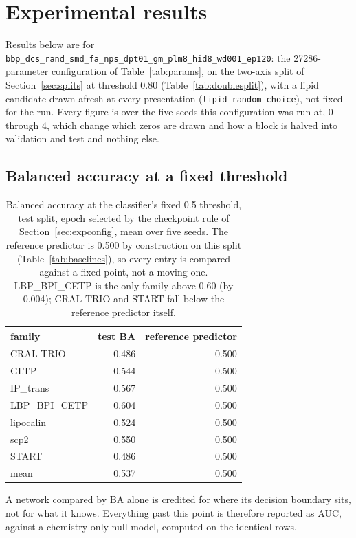 \section{Experimental results}
\label{sec:results}

Results below are for
\texttt{bbp\_dcs\_rand\_smd\_fa\_nps\_dpt01\_gm\_plm8\_hid8\_wd001\_ep120}: the 27286-parameter
configuration of Table~\ref{tab:params}, on the two-axis split of Section~\ref{sec:splits}
at threshold 0.80 (Table~\ref{tab:doublesplit}), with a lipid candidate drawn afresh at
every presentation (\texttt{lipid\_random\_choice}), not fixed for the run. Every
figure is over the five seeds this configuration was run at, 0 through 4, which change
which zeros are drawn and how a block is halved into validation and test and nothing
else.

\subsection{Balanced accuracy at a fixed threshold}

\begin{table}[htbp]
\centering
\begin{tabular}{lrr}
\hline
family & test BA & reference predictor \\
\hline
CRAL-TRIO & 0.486 & 0.500 \\
GLTP & 0.544 & 0.500 \\
IP\_trans & 0.567 & 0.500 \\
LBP\_BPI\_CETP & 0.604 & 0.500 \\
lipocalin & 0.524 & 0.500 \\
scp2 & 0.550 & 0.500 \\
START & 0.486 & 0.500 \\
\hline
mean & 0.537 & 0.500 \\
\hline
\end{tabular}
\caption{Balanced accuracy at the classifier's fixed 0.5 threshold, test split, epoch
selected by the checkpoint rule of Section~\ref{sec:expconfig}, mean over five seeds.
The reference predictor is 0.500 by construction on this split (Table~\ref{tab:baselines}),
so every entry is compared against a fixed point, not a moving one. LBP\_BPI\_CETP is
the only family above 0.60 (by 0.004); CRAL-TRIO and START fall below the reference
predictor itself.}
\label{tab:randba}
\end{table}

A network compared by BA alone is credited for where its decision boundary sits, not for
what it knows. Everything past this point is therefore reported as AUC, against a
chemistry-only null model, computed on the identical rows.

